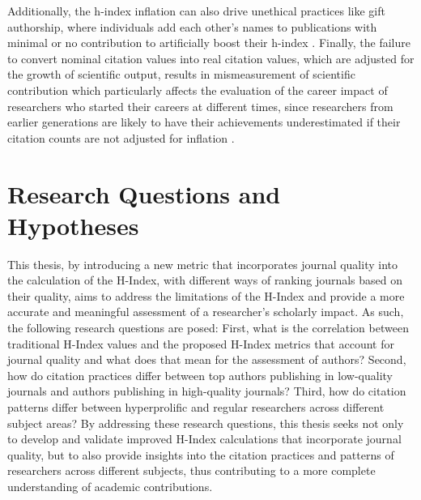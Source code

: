 Additionally, the h-index inflation can also drive unethical practices like
gift authorship, where individuals add each other’s names to publications with
minimal or no contribution to artificially boost their h-index
\cite{bi2023four}. Finally, the failure to convert nominal citation values into
real citation values, which are adjusted for the growth of scientific output,
results in mismeasurement of scientific contribution which particularly affects the
evaluation of the career impact of researchers who started their careers at
different times, since researchers from earlier generations are likely to have
their achievements underestimated if their citation counts are not adjusted for
inflation \cite{petersen2019methods}.

\section{Research Questions and Hypotheses}
This thesis, by introducing a new metric that incorporates journal quality into
the calculation of the H-Index, with different ways of ranking journals based
on their quality, aims to address the limitations of the H-Index and provide a
more accurate and meaningful assessment of a researcher's scholarly impact. As
such, the following research questions are posed: First, what is the
correlation between traditional H-Index values and the proposed H-Index metrics
that account for journal quality and what does that mean for the assessment of
authors? Second, how do citation practices differ between top authors
publishing in low-quality journals and authors publishing in high-quality
journals? Third, how do citation patterns differ between hyperprolific and
regular researchers across different subject areas? By addressing these
research questions, this thesis seeks not only to develop and validate improved
H-Index calculations that incorporate journal quality, but to also provide
insights into the citation practices and patterns of researchers across
different subjects, thus contributing to a more complete understanding of
academic contributions.